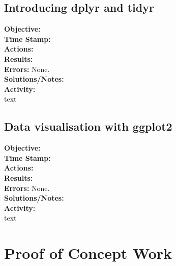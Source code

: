 \documentclass{article}
\begin{document}
\begin{FlushLeft}
\subsection{Introducing dplyr and tidyr}
\textbf{Objective: }\\ 
\textbf{Time Stamp:} \\
\textbf{Actions:} \\
\textbf{Results:}\\
\textbf{Errors:} None.\\
\textbf{Solutions/Notes:}\\
\vspace{5mm}
\textbf{Activity: }\\ 
text\\

\subsection{Data visualisation with ggplot2}
\textbf{Objective: }\\ 
\textbf{Time Stamp:} \\
\textbf{Actions:} \\
\textbf{Results:}\\
\textbf{Errors:} None.\\
\textbf{Solutions/Notes:}\\
\vspace{5mm}
\textbf{Activity: }\\ 
text\\

\pagebreak

\section{Proof of Concept Work}


\end{FlushLeft}
\end{document}
